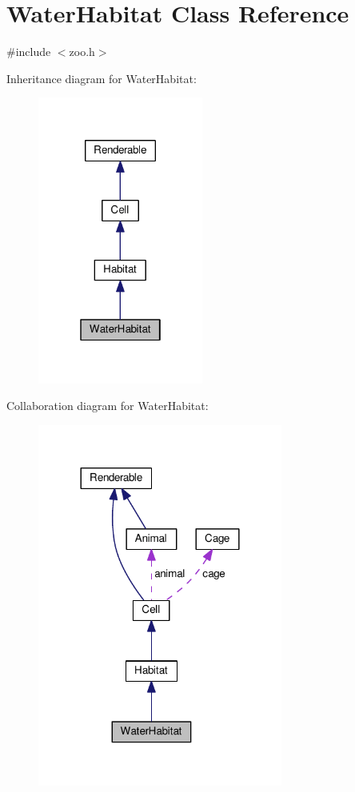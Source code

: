 \hypertarget{classWaterHabitat}{}\section{Water\+Habitat Class Reference}
\label{classWaterHabitat}


{\ttfamily \#include $<$zoo.\+h$>$}



Inheritance diagram for Water\+Habitat\+:
\nopagebreak
\begin{figure}[H]
\begin{center}
\leavevmode
\includegraphics[width=154pt]{classWaterHabitat__inherit__graph}
\end{center}
\end{figure}


Collaboration diagram for Water\+Habitat\+:
\nopagebreak
\begin{figure}[H]
\begin{center}
\leavevmode
\includegraphics[width=228pt]{classWaterHabitat__coll__graph}
\end{center}
\end{figure}
